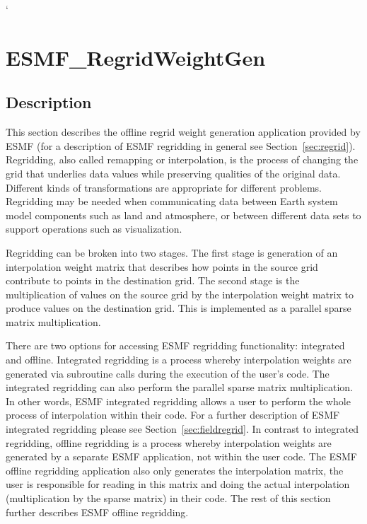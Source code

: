 `
\section{ESMF\_RegridWeightGen}
\label{sec:ESMF_RegridWeightGen}

\subsection{Description}

This section describes the offline regrid weight generation application provided by ESMF (for a description of ESMF regridding in general see Section~\ref{sec:regrid}). Regridding, also called remapping or interpolation, is the process of changing the grid that underlies data values while preserving qualities of the original data. Different kinds of transformations are appropriate for different problems. Regridding may be needed when communicating data between Earth system model components such as land and atmosphere, or between different data sets to support operations such as visualization. 

Regridding can be broken into two stages. The first stage is generation of an interpolation weight matrix that describes how points in
the source grid contribute to points in the destination grid. The second stage is the multiplication of values on the source grid by the
interpolation weight matrix to produce values on the destination grid. This is implemented as a parallel sparse matrix multiplication.

There are two options for accessing ESMF regridding functionality: integrated and offline. Integrated regridding is a process whereby interpolation
weights are generated via subroutine calls during the execution of the user's code. The integrated regridding can also perform the parallel sparse
matrix multiplication. In other words, ESMF integrated regridding allows a user to perform the whole process of interpolation within their code.
For a further description of ESMF integrated regridding please see Section~\ref{sec:fieldregrid}. 
In contrast to integrated regridding,
offline regridding is a process whereby interpolation weights are generated by a separate ESMF application, not within the user code. The ESMF offline
regridding application also only generates the interpolation matrix, the user is responsible for reading in this matrix and doing the actual interpolation
 (multiplication by the sparse matrix) in their code. The rest of this section further describes ESMF offline regridding.


